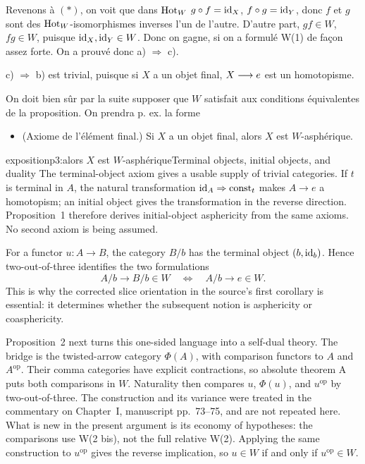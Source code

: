 Revenons à $(*)$, on voit que dans $\mathrm{Hot}_W$ $g \circ f = \mathrm{id}_X$, $f \circ g = \mathrm{id}_Y$, donc $f$ et $g$ sont des $\mathrm{Hot}_W$-isomorphismes inverses l'un de l'autre. D'autre part, $gf \in W$, $fg \in W$, puisque $\mathrm{id}_X, \mathrm{id}_Y \in W$. Donc on gagne, si on a formulé W(1) de façon assez forte. On a prouvé donc a) $\Longrightarrow$ c).

c) $\Longrightarrow$ b) est trivial, puisque si $X$ a un objet final, $X \longrightarrow e$ est un homotopisme.


On doit bien sûr par la suite supposer que $W$ satisfait aux conditions équivalentes de la proposition. On prendra p. ex. la forme

\begin{itemize}[leftmargin=*]
\item[\textbf{W(3)}] (Axiome de l'élément final.) Si $X$ a un objet final, alors $X$ est $W$-asphérique.
\end{itemize}

\begin{dcomment}{exposition}{p3:alors $X$ est $W$-asphérique}{Terminal objects, initial objects, and duality}
The terminal-object axiom gives a usable supply of trivial categories. If \(t\) is terminal in \(A\), the natural transformation \(\mathrm{id}_A\Rightarrow \operatorname{const}_t\) makes \(A\to e\) a homotopism; an initial object gives the transformation in the reverse direction. Proposition~1 therefore derives initial-object asphericity from the same axioms. No second axiom is being assumed.

For a functor \(u:A\to B\), the category \(B/b\) has the terminal object \((b,\mathrm{id}_b)\). Hence two-out-of-three identifies the two formulations
\[
 A/b\longrightarrow B/b\in W
 \quad\Longleftrightarrow\quad A/b\longrightarrow e\in W .
\]
This is why the corrected slice orientation in the source's first corollary is essential: it determines whether the subsequent notion is asphericity or coasphericity.

Proposition~2 next turns this one-sided language into a self-dual theory. The bridge is the twisted-arrow category \(\Phi(A)\), with comparison functors to \(A\) and \(A^{\mathrm{op}}\). Their comma categories have explicit contractions, so absolute theorem A puts both comparisons in \(W\). Naturality then compares \(u\), \(\Phi(u)\), and \(u^{\mathrm{op}}\) by two-out-of-three. The construction and its variance were treated in the commentary on Chapter~I, manuscript pp.~73--75, and are not repeated here. What is new in the present argument is its economy of hypotheses: the comparisons use W(2 bis), not the full relative W(2). Applying the same construction to \(u^{\mathrm{op}}\) gives the reverse implication, so \(u\in W\) if and only if \(u^{\mathrm{op}}\in W\).
\end{dcomment}



